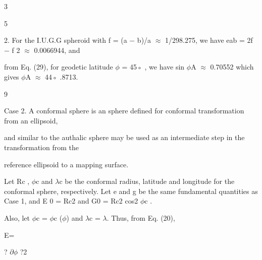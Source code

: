 \documentclass[a4paper,portrait,12pt]{article}
\begin{document}
3


5


\begin{flushleft}
2. For the I.U.G.G spheroid with f = (a $-$ b)/a $\approx$ 1/298.275, we have eab = 2f $-$ f 2 $\approx$ 0.0066944, and
\end{flushleft}


\begin{flushleft}
from Eq. (29), for geodetic latitude $\phi$ = 45◦ , we have sin $\phi$A $\approx$ 0.70552 which gives $\phi$A $\approx$ 44◦ .8713.
\end{flushleft}





9





\begin{flushleft}
\newpage
Case 2. A conformal sphere is an sphere defined for conformal transformation from an ellipsoid,
\end{flushleft}


\begin{flushleft}
and similar to the authalic sphere may be used as an intermediate step in the transformation from the
\end{flushleft}


\begin{flushleft}
reference ellipsoid to a mapping surface.
\end{flushleft}


\begin{flushleft}
Let Rc , $\phi$c and $\lambda$c be the conformal radius, latitude and longitude for the conformal sphere, respectively. Let e and g be the same fundamental quantities as Case 1, and E 0 = Rc2 and G0 = Rc2 cos2 $\phi$c .
\end{flushleft}


\begin{flushleft}
Also, let $\phi$c = $\phi$c ($\phi$) and $\lambda$c = $\lambda$. Thus, from Eq. (20),
\end{flushleft}


\begin{flushleft}
E=
\end{flushleft}





\begin{flushleft}
? $\partial$$\phi$ ?2
\end{flushleft}
\end{document}
